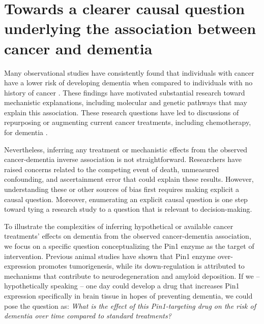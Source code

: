 \documentclass[
]{book}
\begin{document}
\hypertarget{towards-a-clearer-causal-question-underlying-the-association-between-cancer-and-dementia}{%
\section{Towards a clearer causal question underlying the association between cancer and dementia}\label{towards-a-clearer-causal-question-underlying-the-association-between-cancer-and-dementia}}

Many observational studies have consistently found that individuals with cancer have a lower risk of developing dementia when compared to individuals with no history of cancer \autocite{ma2014,hanson2016,vanderwillik2018,ospina2020}. These findings have motivated substantial research toward mechanistic explanations, including molecular and genetic pathways that may explain this association\autocite{behrens2009,harris2014,nudelman2019,Papin2020,driverbiogeront2014,olson2019,li2021,driverpin12015}. These research questions have led to discussions of repurposing or augmenting current cancer treatments, including chemotherapy, for dementia \autocite{Snyder2017}.

Nevertheless, inferring any treatment or mechanistic effects from the observed cancer-dementia inverse association is not straightforward. Researchers have raised concerns related to the competing event of death, unmeasured confounding, and ascertainment error that could explain these results\autocite{driverbiogeront2014,ganguli2015}. However, understanding these or other sources of bias first requires making explicit a causal question. Moreover, enumerating an explicit causal question is one step toward tying a research study to a question that is relevant to decision-making\autocite{didelez2016,labrecque2017}.

To illustrate the complexities of inferring hypothetical or available cancer treatments' effects on dementia from the observed cancer-dementia association, we focus on a specific question conceptualizing the Pin1 enzyme as the target of intervention. Previous animal studies have shown that Pin1 enzyme over-expression promotes tumorigenesis, while its down-regulation is attributed to mechanisms that contribute to neurodegeneration and amyloid deposition\autocite{driverpin12015,angelucci2017,li2021}. If we -- hypothetically speaking -- one day could develop a drug that increases Pin1 expression specifically in brain tissue in hopes of preventing dementia, we could pose the question as: \emph{What is the effect of this Pin1-targeting drug on the risk of dementia over time compared to standard treatments?}
\end{document}
